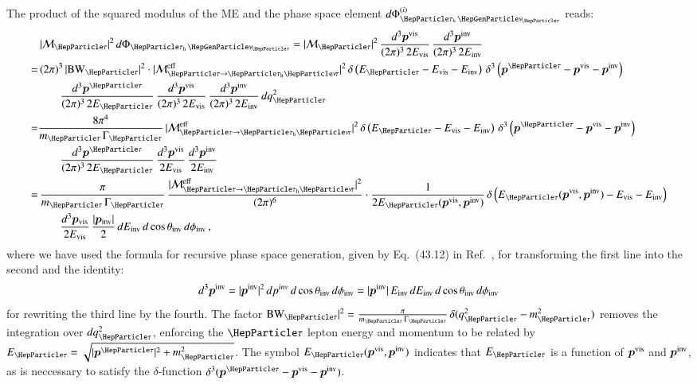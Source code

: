 The product of the squared modulus of the ME and the phase space
element $d\Phi^{(i)}_{\tauhnu}$ reads:
\begin{align}
 & \, \vert\mathcal{M}_{\Pgt}\vert^{2} \,
 d\Phi_{\tauhnu} = \vert\mathcal{M}_{\Pgt}\vert^{2} \, \frac{d^{3}\bm{p}^{\vis}}{(2\pi)^{3} \, 2
   E_{\vis}} \, \frac{d^{3}\bm{p}^{\inv}}{(2\pi)^{3} \, 2 E_{\inv}} \nonumber \\
= & \, (2\pi)^{3} \, \vert \BW_{\Pgt} \vert^{2} \cdot \vert\mathcal{M}^{\eff}_{\Pgt \to
  \tauh\Pnut}\vert^{2} \, \delta \left( E_{\Pgt} - E_{\vis} -
  E_{\inv} \right) \, \delta^{3} \left( \bm{p}^{\Pgt} - \bm{p}^{\vis}
  - \bm{p}^{\inv} \right) \nonumber \\
& \qquad \frac{d^{3}\bm{p}^{\Pgt}}{(2\pi)^{3} \, 2 E_{\Pgt}} \, 
  \frac{d^{3}\bm{p}^{\vis}}{(2\pi)^{3} \, 2E_{\vis}} \, \frac{d^{3}\bm{p}^{\inv}}{(2\pi)^{3} \, 2 E_{\inv}} \, dq^{2}_{\Pgt} \nonumber \\
= & \frac{8\pi^{4}}{m_{\Pgt} \, \Gamma_{\Pgt}} \, \vert\mathcal{M}^{\eff}_{\Pgt \to
  \tauh\Pnut}\vert^{2} \, \delta \left( E_{\Pgt} - E_{\vis} -
  E_{\inv} \right) \, \delta^{3} \left( \bm{p}^{\Pgt} - \bm{p}^{\vis}
  - \bm{p}^{\inv} \right) \nonumber \\
& \qquad \frac{d^{3}\bm{p}^{\Pgt}}{(2\pi)^{3} \, 2 E_{\Pgt}} \, 
  \frac{d^{3}\bm{p}^{\vis}}{2 E_{\vis}} \, \frac{d^{3}\bm{p}^{\inv}}{2
    E_{\inv}} \nonumber \\
= & \, \frac{\pi}{m_{\Pgt} \, \Gamma_{\Pgt}} \, \frac{\vert\mathcal{M}^{\eff}_{\Pgt \to
  \tauh\Pnut}\vert^{2}}{(2\pi)^{6}} 
 \cdot \frac{1}{2 E_{\Pgt}(\bm{p}^{\vis}, \bm{p}^{\inv})} \, \delta
 \left( E_{\Pgt}(\bm{p}^{\vis}, \bm{p}^{\inv}) - E_{\vis} - E_{\inv}
 \right) \nonumber \\
& \qquad
  \frac{d^{3}\bm{p}_{\vis}}{2 E_{\vis}} \, \frac{\vert\bm{p}_{\inv}\vert}{2} \, dE_{\inv} \, d\cos\theta_{\inv} \, d\phi_{\inv} \, ,
\label{eq:hadTauDecaysPSint}
\end{align}
where we have used the formula for recursive phase space generation,
given by Eq.~(43.12) in Ref.~\cite{PDG}, for transforming the first line into the second
and the identity:
\begin{equation} 
d^{3}\bm{p}^{\textrm{inv}} = \vert\bm{p}^{\textrm{inv}}\vert^{2} \,
dp^{inv} \, d\cos\theta_{\textrm{inv}} \, d\phi_{\textrm{inv}} =
\vert\bm{p}^{\textrm{inv}}\vert \, E_{\textrm{inv}} \, dE_{\textrm{inv}} \, d\cos\theta_{\textrm{inv}}
\, d\phi_{\textrm{inv}}
\end{equation} 
for rewriting the third line by the fourth.
The factor $\BW_{\Pgt} \vert^{2} = \frac{\pi}{m_{\Pgt} \,
  \Gamma_{\Pgt}} \, \delta ( q^{2}_{\Pgt} - m^{2}_{\Pgt} )$ removes
the integration over $dq^{2}_{\Pgt}$, enforcing the $\Pgt$ lepton
energy and momentum to be related by $E_{\Pgt} =
\sqrt{\vert\bm{p}^{\Pgt}\vert^{2} + m_{\Pgt}^{2}}$.
The symbol $E_{\Pgt}(\bm{p}^{\vis}, \bm{p}^{\inv})$
indicates that $E_{\Pgt}$ is a function of $\bm{p}^{\textrm{vis}}$
and $\bm{p}^{\textrm{inv}}$, as is neccessary to satisfy the $
\delta$-function $\delta^{3} ( \bm{p}^{\Pgt} - \bm{p}^{\vis} - \bm{p}^{\inv} )$.

